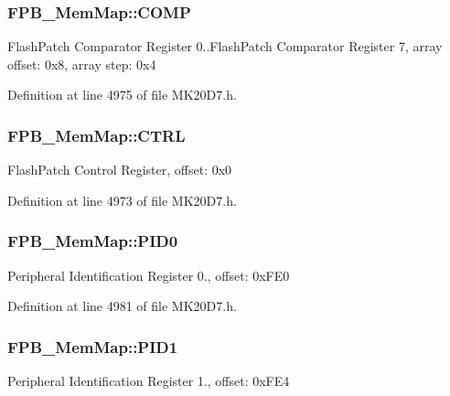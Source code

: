 \subsubsection[{\texorpdfstring{C\+O\+MP}{COMP}}]{ F\+P\+B\+\_\+\+Mem\+Map\+::\+C\+O\+MP}\hypertarget{struct_f_p_b___mem_map_af211a1d0517eee3b95fe6d8453332490}{}\label{struct_f_p_b___mem_map_af211a1d0517eee3b95fe6d8453332490}
Flash\+Patch Comparator Register 0..Flash\+Patch Comparator Register 7, array offset\+: 0x8, array step\+: 0x4 

Definition at line 4975 of file M\+K20\+D7.\+h.

\subsubsection[{\texorpdfstring{C\+T\+RL}{CTRL}}]{ F\+P\+B\+\_\+\+Mem\+Map\+::\+C\+T\+RL}\hypertarget{struct_f_p_b___mem_map_a121a2d8da37c6ebf48cb82cedc2c2be7}{}\label{struct_f_p_b___mem_map_a121a2d8da37c6ebf48cb82cedc2c2be7}
Flash\+Patch Control Register, offset\+: 0x0 

Definition at line 4973 of file M\+K20\+D7.\+h.

\subsubsection[{\texorpdfstring{P\+I\+D0}{PID0}}]{ F\+P\+B\+\_\+\+Mem\+Map\+::\+P\+I\+D0}\hypertarget{struct_f_p_b___mem_map_aa60cb9ab44ceaaee9f7487d64144c1d8}{}\label{struct_f_p_b___mem_map_aa60cb9ab44ceaaee9f7487d64144c1d8}
Peripheral Identification Register 0., offset\+: 0x\+F\+E0 

Definition at line 4981 of file M\+K20\+D7.\+h.

\subsubsection[{\texorpdfstring{P\+I\+D1}{PID1}}]{ F\+P\+B\+\_\+\+Mem\+Map\+::\+P\+I\+D1}\hypertarget{struct_f_p_b___mem_map_a4973e107a9b956437a6e62fb154c1295}{}\label{struct_f_p_b___mem_map_a4973e107a9b956437a6e62fb154c1295}
Peripheral Identification Register 1., offset\+: 0x\+F\+E4 

